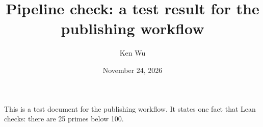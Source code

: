 \documentclass{article}
\title{Pipeline check: a test result for the publishing workflow}
\author{Ken Wu}
\date{November 24, 2026}
\begin{document}
\maketitle
This is a test document for the publishing workflow. It states one fact that Lean checks:
there are 25 primes below 100.
\end{document}
